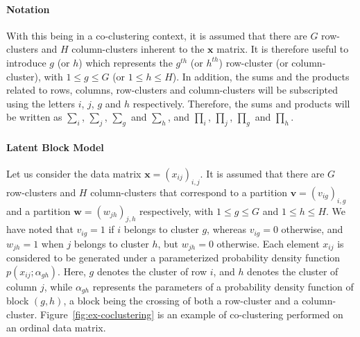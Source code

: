 \paragraph{Notation}
With this being in a co-clustering context, it is assumed that there are $G$ row-clusters and $H$ column-clusters inherent to the $\boldsymbol{x}$ matrix. It is therefore useful to introduce $g$ (or $h$) which represents the $g^{th}$ (or $h^{th}$) row-cluster (or column-cluster), with $1 \leq g \leq G$ (or $1 \leq h \leq H$). In addition, the sums and the products related to rows, columns, row-clusters and column-clusters will be subscripted using the letters $i$, $j$, $g$ and $h$ respectively.  Therefore, the sums and products will be written as $\underset{i}{\sum}$, $\underset{j}{\sum}$, $\underset{g}{\sum}$ and $\underset{h}{\sum}$, and $\underset{i}{\prod}$, $\underset{j}{\prod}$, $\underset{g}{\prod}$ and $\underset{h}{\prod}$.

\paragraph{Latent Block Model}
Let us consider the data matrix $\boldsymbol{x} = \left(x_{ij}\right)_{i,j}$. It is assumed that there are $G$ row-clusters and $H$ column-clusters that correspond to a partition $\boldsymbol{v}=\left(v_{ig}\right)_{i,g}$ and a partition $\boldsymbol{w}=\left(w_{jh}\right)_{j,h}$ respectively, with $1\leq g \leq G$ and $1\leq h \leq H$. We have noted that $v_{ig}=1$ if $i$ belongs to cluster $g$, whereas $v_{ig}=0$  otherwise, and $w_{jh}=1$ when $j$ belongs to cluster $h$, but $w_{jh}=0$ otherwise. Each element $x_{ij}$ is considered to be generated under a parameterized probability density function $p\left(x_{ij};\alpha_{gh}\right)$. Here, $g$ denotes the cluster of row $i$, and $h$ denotes the cluster of column $j$, while $\alpha_{gh}$ represents the parameters of a probability density function of block $\left(g,h\right)$, a block being the crossing of both a row-cluster and a column-cluster. Figure~\ref{fig:ex-coclustering} is an example of co-clustering performed on an ordinal data matrix.


